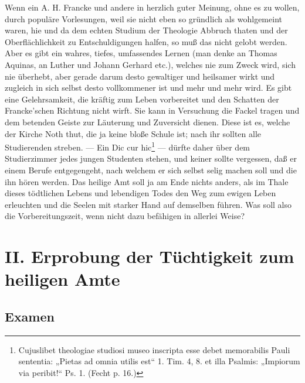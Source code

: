 Wenn ein A. H. Francke und andere in herzlich guter Meinung, ohne es zu wollen, durch populäre Vorlesungen, weil sie nicht eben so gründlich als wohlgemeint waren, hie und da dem echten Studium der Theologie Abbruch thaten und der Oberflächlichkeit zu Entschuldigungen halfen, so muß das nicht gelobt werden. Aber es gibt ein wahres, tiefes, umfassendes Lernen (man denke an Thomas Aquinas, an Luther und Johann Gerhard etc.), welches nie zum Zweck wird, sich nie überhebt, aber gerade darum desto gewaltiger und heilsamer wirkt und zugleich in sich selbst desto vollkommener ist und mehr und mehr wird. Es gibt eine Gelehrsamkeit, die kräftig zum Leben vorbereitet und den Schatten der Francke’schen Richtung nicht wirft. Sie kann in Versuchung die Fackel tragen und dem betenden Geiste zur Läuterung und Zuversicht dienen. Diese ist es, welche der Kirche Noth thut, die ja keine bloße Schule ist; nach ihr sollten alle Studierenden streben. — Ein Dic cur hic\footnote{Cujuslibet theologiae studiosi museo inscripta esse debet memorabilis Pauli sententia: „Pietas ad omnia utilis est“ 1. Tim. 4, 8. et illa Psalmis: „Impiorum via peribit!“ Ps. 1. (Fecht p. 16.)} — dürfte daher über
dem Studierzimmer jedes jungen Studenten stehen, und keiner sollte vergessen, daß er einem Berufe entgegengeht, nach welchem er sich selbst selig machen soll und die ihn hören werden. Das heilige Amt soll ja am Ende nichts anders, als im Thale dieses tödtlichen Lebens und lebendigen Todes den Weg zum ewigen Leben erleuchten und die Seelen mit starker Hand auf demselben führen. Was soll also die Vorbereitungszeit, wenn nicht dazu befähigen in allerlei Weise?

\section[II. Erprobung der Tüchtigkeit]{II. Erprobung der Tüchtigkeit zum heiligen Amte}

\subsection{Examen}

